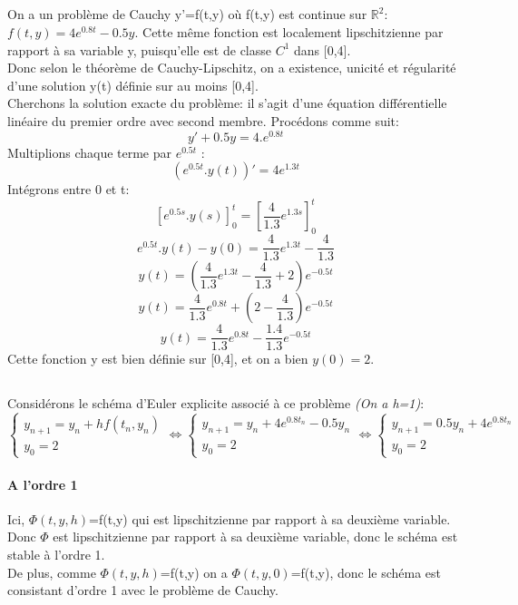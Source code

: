 \documentclass[a4paper,12pt,landscape]{article}
\begin{document}
\subsection{}
On a un problème de Cauchy y'=f(t,y) où f(t,y) est continue sur $\mathbb{R}^2$: $f(t,y)=4e^{0.8t}-0.5y$. Cette même fonction est localement lipschitzienne par rapport à sa variable y, puisqu'elle est de classe $C^1$ dans [0,4].\\
Donc selon le théorème de Cauchy-Lipschitz, on a existence, unicité et régularité d'une solution y(t) définie sur au moins [0,4].\\

Cherchons la solution exacte du problème: il s'agit d'une équation différentielle linéaire du premier ordre avec second membre. Procédons comme suit:
$$y'+0.5y=4.e^{0.8t}$$
Multiplions chaque terme par $e^{0.5t}$ : $$(e^{0.5t}.y(t))'=4e^{1.3t}$$
Intégrons entre 0 et t: $${\left[ e^{0.5s}.y(s) \right]}^t_0={\left[ \frac{4}{1.3}e^{1.3s} \right]}^t_0$$
$$e^{0.5t}.y(t)-y(0)=\frac{4}{1.3}e^{1.3t}-\frac{4}{1.3}$$
$$y(t)={\left( \frac{4}{1.3}e^{1.3t}-\frac{4}{1.3}+2 \right)}e^{-0.5t}$$
$$y(t)=\frac{4}{1.3}e^{0.8t}+{\left( 2-\frac{4}{1.3} \right) }e^{-0.5t}$$
$$y(t)=\frac{4}{1.3}e^{0.8t} -\frac{1.4}{1.3} e^{-0.5t}$$
Cette fonction y est bien définie sur [0,4], et on a bien $y(0)=2$.

\subsection{}
Considérons le schéma d'Euler explicite associé à ce problème {\it (On a h=1)}:
$$\left \{
\begin{array}{l}
	y_{n+1}= y_n + h f(t_n,y_n)\\
	y_0 = 2
\end{array}
\right.
\Leftrightarrow
\left \{
\begin{array}{l}
	y_{n+1}= y_n + 4e^{0.8t_n}-0.5y_n\\
	y_0 = 2
\end{array}
\right.
\Leftrightarrow
\left \{
\begin{array}{l}
	y_{n+1}= 0.5y_n + 4e^{0.8t_n}\\
	y_0 = 2
\end{array}
\right.$$
\paragraph{A l'ordre 1}
Ici, $\Phi(t,y,h)$=f(t,y) qui est lipschitzienne par rapport à sa deuxième variable. Donc $\Phi$ est lipschitzienne par rapport à sa deuxième variable, donc le schéma est stable à l'ordre 1.\\
De plus, comme $\Phi(t,y,h)$=f(t,y) on a $\Phi(t,y,0)$=f(t,y), donc le schéma est consistant d'ordre 1 avec le problème de Cauchy.\\
\end{document}
